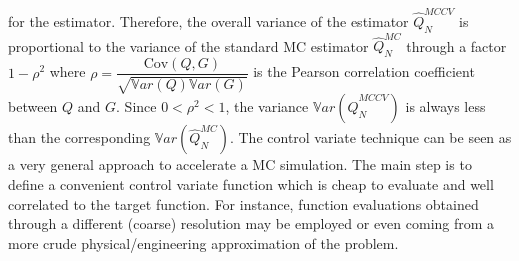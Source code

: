 for the estimator. Therefore, the overall variance of the estimator $\hat{Q}_N^{MCCV}$ is proportional to the variance of the standard
MC estimator $\hat{Q}_N^{MC}$ through a factor $1-\rho^2$ where $\rho = \dfrac{ \mathrm{Cov}\left(Q,G\right) }{\sqrt{\mathbb{V}ar\left(Q\right)\mathbb{V}ar\left(G\right)}}$ is the Pearson
correlation coefficient between $Q$ and $G$. Since $0<\rho^2<1$, the variance $\mathbb{V}ar\left( \hat{Q}_N^{MCCV} \right)$ is always less than
the corresponding $\mathbb{V}ar\left({\hat{Q}_N^{MC}}\right)$. The control variate technique can be seen as a very general approach
to accelerate a MC simulation. The main step is to define a convenient control variate function which is cheap to evaluate and well correlated 
to the target function. For instance, function evaluations obtained through a different (coarse) resolution may be employed or even coming 
from a more crude physical/engineering approximation of the problem.


